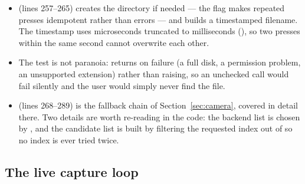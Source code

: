 \begin{codecard}

\end{codecard}

\begin{itemize}
  \item \textbf{} (lines 257--265) creates the directory if needed --- the
         flag makes repeated presses idempotent rather than errors --- and builds
        a timestamped filename. The timestamp uses  microseconds truncated to milliseconds
        (\code{[:-3]}), so two presses within the same second cannot overwrite each other.
  \item The  test is not paranoia:  returns  on
        failure (a full disk, a permission problem, an unsupported extension) rather than raising, so
        an unchecked call would fail silently and the user would simply never find the file.
  \item \textbf{} (lines 268--289) is the fallback chain of
        Section~\ref{sec:camera}, covered in detail there. Two details are worth re-reading in the
        code: the backend list is chosen by , and the candidate list is built
        by filtering the requested index out of  so no index is ever tried twice.
\end{itemize}

\subsection{The live capture loop}

\begin{codecard}

\end{codecard}

